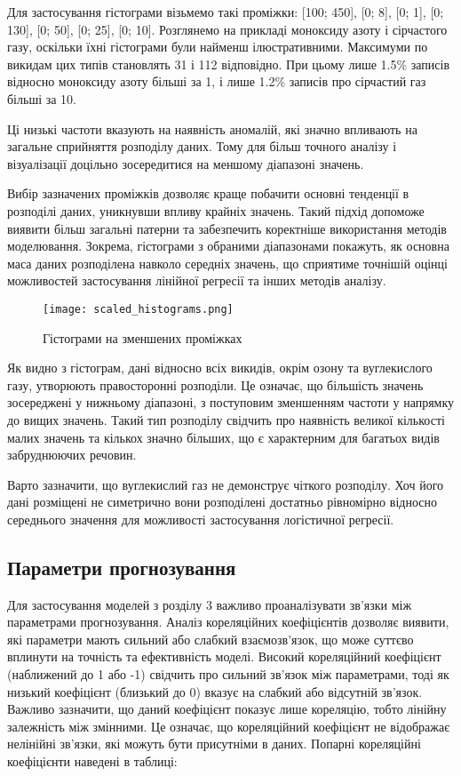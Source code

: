 Для застосування гістограми візьмемо такі проміжки: [100; 450], [0; 8], [0; 1], [0; 130], [0; 50], [0; 25], [0; 10]. Розглянемо на прикладі моноксиду азоту і сірчастого газу, оскільки їхні гістограми були найменш ілюстративними. Максимуми по викидам цих типів становлять 31 і 112 відповідно. При цьому лише 1.5\% записів відносно моноксиду азоту більші за 1, і лише 1.2\% записів про сірчастий газ більші за 10.

Ці низькі частоти вказують на наявність аномалій, які значно впливають на загальне сприйняття розподілу даних. Тому для більш точного аналізу і візуалізації доцільно зосередитися на меншому діапазоні значень.

Вибір зазначених проміжків дозволяє краще побачити основні тенденції в розподілі даних, уникнувши впливу крайніх значень. Такий підхід допоможе виявити більш загальні патерни та забезпечить коректніше використання методів моделювання. Зокрема, гістограми з обраними діапазонами покажуть, як основна маса даних розподілена навколо середніх значень, що сприятиме точнішій оцінці можливостей застосування лінійної регресії та інших методів аналізу.

\begin{figure}[H]
    \begin{center}
        \texttt{[image: scaled\_histograms.png]}
        \caption{Гістограми на зменшених проміжках}
    \end{center}
\end{figure}

Як видно з гістограм, дані відносно всіх викидів, окрім озону та вуглекислого газу, утворюють правосторонні розподіли. Це означає, що більшість значень зосереджені у нижньому діапазоні, з поступовим зменшенням частоти у напрямку до вищих значень. Такий тип розподілу свідчить про наявність великої кількості малих значень та кількох значно більших, що є характерним для багатьох видів забруднюючих речовин.

Варто зазначити, що вуглекислий газ не демонструє чіткого розподілу. 
Хоч його дані розміщені не симетрично вони розподілені достатньо рівномірно відносно середнього значення для можливості застосування логістичної регресії.

\subsection{Параметри прогнозування}

Для застосування моделей з розділу 3 важливо проаналізувати зв’язки між параметрами прогнозування. 
Аналіз кореляційних коефіцієнтів дозволяє виявити, які параметри мають сильний або слабкий взаємозв’язок, що може суттєво вплинути на точність та ефективність моделі. 
Високий кореляційний коефіцієнт (наближений до 1 або -1) свідчить про сильний зв’язок між параметрами, тоді як низький коефіцієнт (близький до 0) вказує на слабкий або відсутній зв’язок. 
Важливо зазначити, що даний коефіцієнт показує лише кореляцію, тобто лінійну залежність між змінними. 
Це означає, що кореляційний коефіцієнт не відображає нелінійні зв’язки, які можуть бути присутніми в даних.
Попарні кореляційні коефіцієнти наведені в таблиці:


